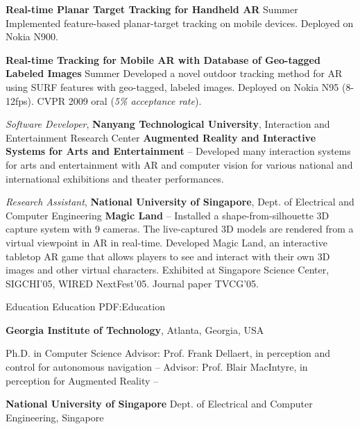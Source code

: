 \documentclass[letterpaper,MMMyyyy,nonstopmode]{simpleresumecv}
\begin{document}
\begin{Body}
\Gap
\BulletItem
\textbf{Real-time Planar Target Tracking for Handheld AR}
\hfill
Summer 
\SubBulletItem
Implemented feature-based planar-target tracking on mobile devices. Deployed on Nokia N900.

\Gap
\BulletItem
\textbf{Real-time Tracking for Mobile AR with Database of Geo-tagged Labeled Images}
\hfill
Summer 
\SubBulletItem
Developed a novel outdoor tracking method for AR using SURF features with geo-tagged, labeled images. Deployed on Nokia N95 (8-12fps). CVPR 2009 oral (\textit{5\% acceptance rate}).

\BigGap
\Entry
{\textit{Software Developer}, \textbf{Nanyang Technological University}, Interaction and Entertainment Research Center}
\Gap
\BulletItem
\textbf{Augmented Reality and Interactive Systems for Arts and Entertainment}
\hfill
{} -- 
\SubBulletItem
Developed many interaction systems for arts and entertainment with AR and computer vision for various national and international exhibitions and theater performances.

\BigGap
\Entry
{\textit{Research Assistant}, \textbf{ National University of Singapore}, Dept. of Electrical and Computer Engineering}
\Gap
\BulletItem
\textbf{Magic Land}
\hfill
{} -- 
\SubBulletItem
Installed a shape-from-silhouette 3D capture system with 9 cameras. The live-captured 3D models are rendered from a virtual viewpoint in AR in real-time.
\SubBulletItem
Developed Magic Land, an interactive tabletop AR game that allows players to see and interact with their own 3D images and other virtual characters.
\SubBulletItem
Exhibited at Singapore Science Center, SIGCHI’05, WIRED NextFest’05. Journal paper TVCG'05.



\Section
{Education}
{Education}
{PDF:Education}

\Entry
{\textbf{Georgia Institute of Technology}},
Atlanta, Georgia, USA

\Gap
\BulletItem
Ph.D. in Computer Science
\SubBulletItem
Advisor: Prof. Frank Dellaert, in perception and control for autonomous navigation
\hfill
{} -- 
\SubBulletItem
Advisor: Prof. Blair MacIntyre, in perception for Augmented Reality
\hfill
{} -- 

\BigGap
\Entry
{\textbf{National University of Singapore}}
Dept. of Electrical and Computer Engineering, Singapore


\end{Body}
\end{document}
